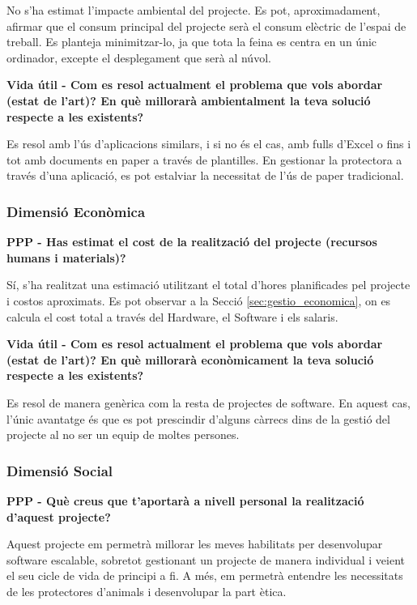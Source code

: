 \documentclass[11pt,a4paper]{report}
\begin{document}
No s'ha estimat l'impacte ambiental del projecte. Es pot, aproximadament, afirmar que el consum principal del projecte serà el consum elèctric de l'espai de treball. Es planteja minimitzar-lo, ja que tota la feina es centra en un únic ordinador, excepte el desplegament que serà al núvol.

\textbf{Vida útil - Com es resol actualment el problema que vols abordar (estat de l'art)? En què millorarà ambientalment la teva solució respecte a les existents?}

Es resol amb l'ús d'aplicacions similars, i si no és el cas, amb fulls d'Excel o fins i tot amb documents en paper a través de plantilles. En gestionar la protectora a través d'una aplicació, es pot estalviar la necessitat de l'ús de paper tradicional.

\subsubsection{Dimensió Econòmica}

\textbf{PPP - Has estimat el cost de la realització del projecte (recursos humans i materials)?}

Sí, s'ha realitzat una estimació utilitzant el total d'hores planificades pel projecte i costos aproximats. Es pot observar a la Secció \ref{sec:gestio_economica}, on es calcula el cost total a través del Hardware, el Software i els salaris.

\textbf{Vida útil - Com es resol actualment el problema que vols abordar (estat de l'art)? En què millorarà econòmicament la teva solució respecte a les existents?}

Es resol de manera genèrica com la resta de projectes de software. En aquest cas, l'únic avantatge és que es pot prescindir d'alguns càrrecs dins de la gestió del projecte al no ser un equip de moltes persones.

\subsubsection{Dimensió Social}

\textbf{PPP - Què creus que t'aportarà a nivell personal la realització d'aquest projecte?}

Aquest projecte em permetrà millorar les meves habilitats per desenvolupar software escalable, sobretot gestionant un projecte de manera individual i veient el seu cicle de vida de principi a fi. A més, em permetrà entendre les necessitats de les protectores d'animals i desenvolupar la part ètica.
\end{document}
